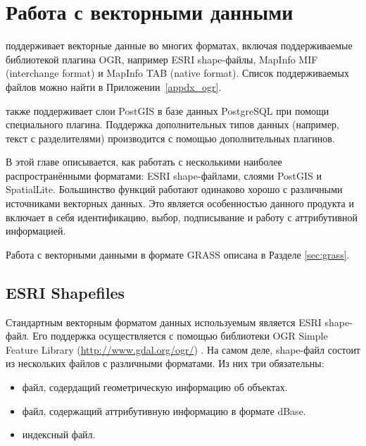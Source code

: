 
\chapter{Работа с векторными данными}\label{label_workingvector}


\qg поддерживает векторные данные во многих форматах, включая
поддерживаемые библиотекой плагина OGR, например ESRI shape-файлы,
MapInfo MIF (interchange format)
и MapInfo TAB (native format).
Список поддерживаемых файлов можно найти в Приложении~\ref{appdx_ogr}.

\qg также поддерживает слои PostGIS
в базе данных PostgreSQL при помощи специального плагина.
Поддержка дополнительных типов данных (например, текст с разделителями) производится
с помощью дополнительных плагинов.

В этой главе описывается, как работать с несколькими наиболее распространёнными форматами:
ESRI shape-файлами, слоями PostGIS и SpatialLite. Большинство
функций \qg работают одинаково хорошо с различными источниками векторных данных.
Это является особенностью данного продукта и включает в себя идентификацию, выбор, подписывание и работу с аттрибутивной информацией.

Работа с векторными данными в формате GRASS описана в Разделе \ref{sec:grass}.

\section{ESRI Shapefiles}

Стандартным векторным форматом данных используемым \qg является ESRI shape-файл. Его поддержка
осуществляется с помощью библиотеки OGR Simple Feature Library (\url{http://www.gdal.org/ogr/})
. На самом деле, shape-файл состоит из нескольких файлов с различными форматами. Из них три обязательны:

\begin{itemize}[label=--]
\item {} файл, содердащий геометрическую информацию об объектах.
\item {} файл, содержащий аттрибутивную информацию в формате dBase.
\item {} индексный файл.
\end{itemize}

